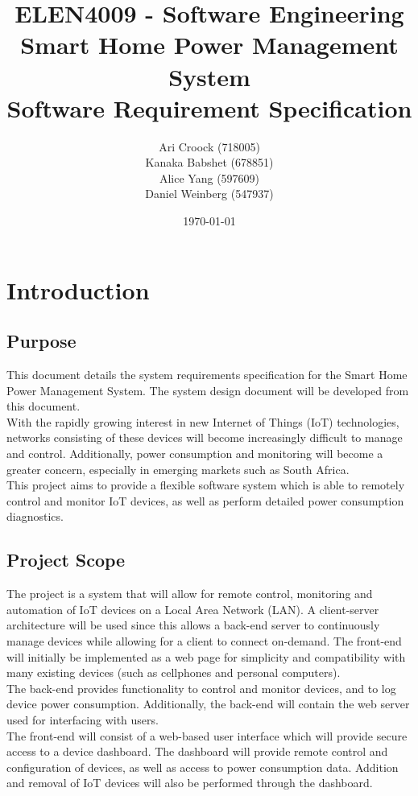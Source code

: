 \documentclass[11pt, a4paper]{article}
\title{ELEN4009 - Software Engineering\\Smart Home Power Management System\\Software Requirement Specification}
\author{Ari Croock (718005)\\Kanaka Babshet (678851)\\Alice Yang (597609)\\Daniel Weinberg (547937)}
\date{\today}
\begin{document}
	\maketitle
	\section{Introduction}
	\subsection{Purpose}
	This document details the system requirements specification for the Smart Home Power Management System. The system design document will be developed from this document.\\
	\newline 
	\noindent
	With the rapidly growing interest in new Internet of Things (IoT) technologies, networks consisting of these devices will become increasingly difficult to manage and control. Additionally, power consumption and monitoring will become a greater concern, especially in emerging markets such as South Africa.\\
	\newline 
	\noindent
	This project aims to provide a flexible software system which is able to remotely control and monitor IoT devices, as well as perform detailed power consumption diagnostics.
	
	\subsection{Project Scope}
	The project is a system that will allow for remote control, monitoring and automation of IoT devices on a Local Area Network (LAN). A client-server architecture will be used since this allows a back-end server to continuously manage devices while allowing for a client to connect on-demand. The front-end will initially be implemented as a web page for simplicity and compatibility with many existing devices (such as cellphones and personal computers). \\
	\newline 
	\noindent
	The back-end provides functionality to control and monitor devices, and to log device power consumption. Additionally, the back-end will contain the web server used for interfacing with users. \\
	\newline
	\noindent
	The front-end will consist of a web-based user interface which will provide secure access to a device dashboard. The dashboard will provide remote control and configuration of devices, as well as access to power consumption data. Addition and removal of IoT devices will also be performed through the dashboard. 
	
\end{document}
